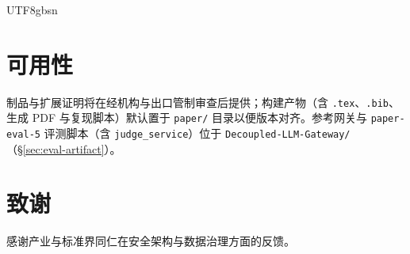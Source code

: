 \documentclass[letterpaper,twocolumn,10pt]{article}
\begin{document}
\begin{CJK}{UTF8}{gbsn}
\section*{可用性}
制品与扩展证明将在经机构与出口管制审查后提供；构建产物（含 \texttt{.tex}、\texttt{.bib}、生成 PDF 与复现脚本）默认置于 \texttt{paper/} 目录以便版本对齐。参考网关与 \texttt{paper-eval-5} 评测脚本（含 \texttt{judge\_service}）位于 \texttt{Decoupled-LLM-Gateway/}（\S\ref{sec:eval-artifact}）。

\section*{致谢}
感谢产业与标准界同仁在安全架构与数据治理方面的反馈。




\end{CJK}
\end{document}
